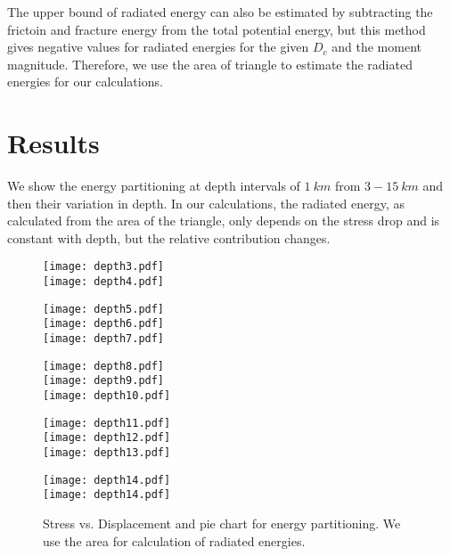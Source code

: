 \documentclass[11pt]{article}
\begin{document}
The upper bound of radiated energy can also be estimated by subtracting the frictoin and fracture energy from the total potential energy, but this method gives negative values for radiated energies for the given $D_c$ and the moment magnitude. Therefore, we use the area of triangle to estimate the radiated energies for our calculations.

\section*{Results}
We show the energy partitioning at depth intervals of $1\ km$ from $3-15\ km$ and then their variation in depth. In our calculations, the radiated energy, as calculated from the area of the triangle, only depends on the stress drop and is constant with depth, but the relative contribution changes.

\begin{figure}[!htb]
    \centering
    \texttt{[image: depth3.pdf]}\\
    \texttt{[image: depth4.pdf]}\\
\end{figure}
\pagebreak
\begin{figure}[!htb]
    \centering
    \texttt{[image: depth5.pdf]}\\
    \texttt{[image: depth6.pdf]}\\
    \texttt{[image: depth7.pdf]}\\
\end{figure}
\pagebreak
\begin{figure}[!htb]
    \centering
    \texttt{[image: depth8.pdf]}\\
    \texttt{[image: depth9.pdf]}\\
    \texttt{[image: depth10.pdf]}\\
\end{figure}
\pagebreak
\begin{figure}[!htb]
    \centering
    \texttt{[image: depth11.pdf]}\\
    \texttt{[image: depth12.pdf]}\\
    \texttt{[image: depth13.pdf]}\\
\end{figure}
\pagebreak
\begin{figure}[!htb]
    \centering
    \texttt{[image: depth14.pdf]}\\
    \texttt{[image: depth14.pdf]}\\
    \caption{Stress vs. Displacement and pie chart for energy partitioning. We use the area for calculation of radiated energies.}
\end{figure}
\clearpage
\end{document}
